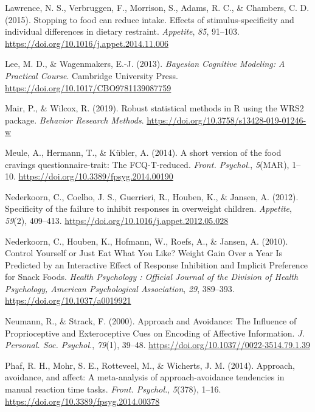 \documentclass[man,floatsintext]{apa6}
\begin{document}
\leavevmode\hypertarget{ref-lawrence_stopping_2015}{}%
Lawrence, N. S., Verbruggen, F., Morrison, S., Adams, R. C., \& Chambers, C. D. (2015). Stopping to food can reduce intake. Effects of stimulus-specificity and individual differences in dietary restraint. \emph{Appetite}, \emph{85}, 91--103. \url{https://doi.org/10.1016/j.appet.2014.11.006}

\leavevmode\hypertarget{ref-lee_bayesian_2013}{}%
Lee, M. D., \& Wagenmakers, E.-J. (2013). \emph{Bayesian Cognitive Modeling: A Practical Course}. Cambridge University Press. \url{https://doi.org/10.1017/CBO9781139087759}

\leavevmode\hypertarget{ref-mair_robust_2019}{}%
Mair, P., \& Wilcox, R. (2019). Robust statistical methods in R using the WRS2 package. \emph{Behavior Research Methods}. \url{https://doi.org/10.3758/s13428-019-01246-w}

\leavevmode\hypertarget{ref-meule_short_2014-1}{}%
Meule, A., Hermann, T., \& Kübler, A. (2014). A short version of the food cravings questionnaire-trait: The FCQ-T-reduced. \emph{Front. Psychol.}, \emph{5}(MAR), 1--10. \url{https://doi.org/10.3389/fpsyg.2014.00190}

\leavevmode\hypertarget{ref-nederkoorn_specificity_2012}{}%
Nederkoorn, C., Coelho, J. S., Guerrieri, R., Houben, K., \& Jansen, A. (2012). Specificity of the failure to inhibit responses in overweight children. \emph{Appetite}, \emph{59}(2), 409--413. \url{https://doi.org/10.1016/j.appet.2012.05.028}

\leavevmode\hypertarget{ref-nederkoorn_control_2010}{}%
Nederkoorn, C., Houben, K., Hofmann, W., Roefs, A., \& Jansen, A. (2010). Control Yourself or Just Eat What You Like? Weight Gain Over a Year Is Predicted by an Interactive Effect of Response Inhibition and Implicit Preference for Snack Foods. \emph{Health Psychology : Official Journal of the Division of Health Psychology, American Psychological Association}, \emph{29}, 389--393. \url{https://doi.org/10.1037/a0019921}

\leavevmode\hypertarget{ref-neumann_approach_2000}{}%
Neumann, R., \& Strack, F. (2000). Approach and Avoidance: The Influence of Proprioceptive and Exteroceptive Cues on Encoding of Affective Information. \emph{J. Personal. Soc. Psychol.}, \emph{79}(1), 39--48. \url{https://doi.org/10.1037//0022-3514.79.1.39}

\leavevmode\hypertarget{ref-phaf_approach_2014}{}%
Phaf, R. H., Mohr, S. E., Rotteveel, M., \& Wicherts, J. M. (2014). Approach, avoidance, and affect: A meta-analysis of approach-avoidance tendencies in manual reaction time tasks. \emph{Front. Psychol.}, \emph{5}(378), 1--16. \url{https://doi.org/10.3389/fpsyg.2014.00378}
\end{document}
